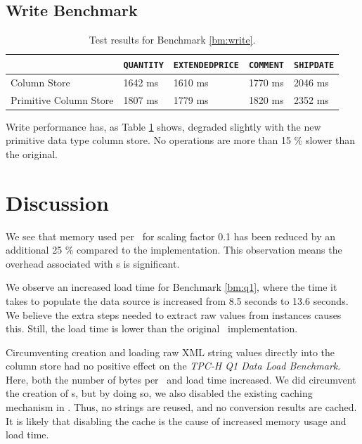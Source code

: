\subsection{Write Benchmark}
\label{sub:Write Benchmark}
\begin{table}
    \begin{tabularx}{\textwidth}{X | X X X X}
         & \texttt{QUANTITY} & \texttt{EXTENDEDPRICE} & \texttt{COMMENT} & \texttt{SHIPDATE}\\ 
        \hline
        \hline
        Column Store & 1642 ms & 1610 ms & 1770 ms & 2046 ms \\
        Primitive Column Store & 1807 ms & 1779 ms & 1820 ms & 2352 ms \\
    \end{tabularx}
    \caption{Test results for Benchmark \ref{bm:write}.}
    \label{tab:primitive-write}
\end{table}
Write performance has, as Table \ref{tab:primitive-write} shows, degraded slightly with the new primitive data type column store. No operations are more than 15 \% slower than the original.

\section{Discussion}
\label{sec:part2-discussion}

We see that memory used per \lineitem~for scaling factor 0.1 has been reduced by an additional 25 \% compared to the  implementation. This observation means the overhead associated with s is significant.

We observe an increased load time for Benchmark \ref{bm:q1}, where the time it takes to populate the data source is increased from 8.5 seconds to 13.6 seconds. We believe the extra steps needed to extract raw values from  instances causes this. Still, the load time is lower than the original \gap~implementation.

Circumventing  creation and loading raw XML string values directly into the column store had no positive effect on the \textit{TPC-H Q1 Data Load Benchmark}. Here, both the number of bytes per \lineitem~and load time increased. We did circumvent the creation of s, but by doing so, we also disabled the existing caching mechanism in \gap. Thus, no strings are reused, and no conversion results are cached. It is likely that disabling the cache is the cause of increased memory usage and load time.


